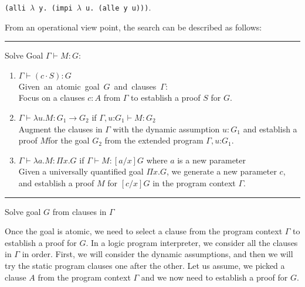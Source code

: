 \documentclass{acmconf}
\newcommand{\figfoot}{\vspace{1ex}\hrule}
\newcommand{\fighead}{\hrule\vspace{1.5ex}}
\newcommand{\vd}{\vdash}
\newcommand{\arrow}{\rightarrow}
\newcommand{\oftp}{\mathord{:}}
\begin{document}
{\tt (alli $\lambda$ y. (impi $\lambda$ u. (alle y u)))}.

 From an operational view point, the search can be described as
 follows: 

\begin{table}[htbp]
\fighead
\begin{small}
Solve Goal $\Gamma \vd M : G$:
\begin{enumerate}
\item $\Gamma \vd (c \cdot S) : G$ \\
    \mbox{Given an atomic goal $G$ and clauses $\Gamma$:}\hfill\\
     Focus on a clauses $c : A$ from $\Gamma$ to establish a proof $S$ for $G$.

\item $\Gamma \vd \lambda u.M : G_1 \arrow G_2$ if $\Gamma, u\oftp G_1
  \vd M : G_2$ \\
Augment the clauses in $\Gamma$ with the dynamic assumption $u : G_1$ and
establish a proof $M$for the goal $G_2$ from the extended  program $\Gamma, u \oftp G_1$.
\item $\Gamma \vd \lambda a.M : \Pi x. G$ if $\Gamma \vd M : [a/x]G$ where $a$ is a new parameter\\
Given a universally quantified goal $\Pi x. G$, we
generate a new parameter $c$, and establish a proof $M$ for $[c/x]G$ in the
 program context $\Gamma$.
\end{enumerate}
\end{small}
\figfoot 
\caption{Solve goal $G$ from clauses in $\Gamma$}
\label{tab:solve}
\end{table}

Once the goal is atomic, we need to select a clause from the
program context $\Gamma$ to establish a proof for $G$. In a logic
program interpreter, we consider all the clauses in $\Gamma$ in order. 
First, we will consider the dynamic assumptions, and then we will try
the static program clauses one after the other. 
Let us assume, we picked a clause $A$ from the program context
$\Gamma$ and we now need to establish a proof for $G$.
\end{document}
